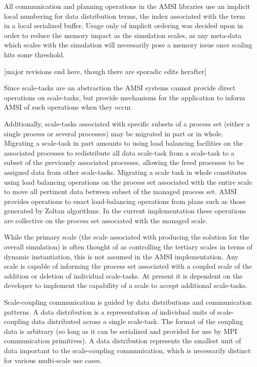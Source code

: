 \documentclass[11pt]{article}
\begin{document}
All communication and planning operations in the AMSI libraries use an implicit local numbering for data distribution terms, the index associated with the term in a local serialized buffer. 
Usage only of implicit ordering was decided upon in order to reduce the memory impact as the simulation scales, as any meta-data which scales with the simulation will necessarily pose a memory issue once scaling hits some threshold.

[major revisions end here, though there are sporadic edits herafter]

Since scale-tasks are an abstraction the AMSI systems cannot provide direct operations on scale-tasks, but provide mechanisms for the application to inform AMSI of such operations when they occur.

Additionally, scale-tasks associated with specific subsets of a process set (either a single process or several processes) may be migrated in part or in whole. Migrating a scale-task in part amounts to using load balancing facilities on the associated processes to redistribute all data scale-task from a scale-task to a subset of the previously associated processes, allowing the freed processes to be assigned data from other scale-tasks. Migrating a scale task in whole constitutes using load balancing operations on the process set associated with the entire scale to move all pertinent data between subset of the managed process set. AMSI provides operations to enact load-balancing operations from plans such as those generated by Zoltan algorithms.  In the current implementation these operations are collective on the process set associated with the managed scale.

While the primary scale (the scale associated with producing the solution for the overall simulation) is often thought of as controlling the tertiary scales in terms of dynamic instantiation, this is not assumed in the AMSI implementation. Any scale is capable of informing the process set associated with a coupled scale of the addition or deletion of individual scale-tasks. At present it is dependent on the developer to implement the capability of a scale to accept additional scale-tasks.

Scale-coupling communication is guided by data distributions and communication patterns. A data distribution is a representation of individual units of scale-coupling data distributed across a single scale-task. The format of the coupling data is arbitrary (so long as it can be serialized and provided for use by MPI communication primitives). A data distribution represents the smallest unit of data important to the scale-coupling communication, which is necessarily distinct for various multi-scale use cases.
\end{document}
